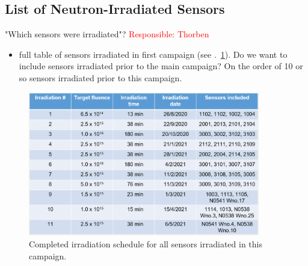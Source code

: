 \subsection{List of Neutron-Irradiated Sensors}
\label{subsec:sensors_irradiation}
"Which sensors were irradiated"? \textcolor{red}{Responsible: Thorben}
\begin{itemize}
  \item full table of sensors irradiated in first campaign (see .~\ref{fig:Irradiation_Schedule}). Do we want to include sensors irradiated prior to the main campaign? On the order of 10 or so sensors irradiated prior to this campaign.
\end{itemize}

\begin{figure}[!hbt]
  \begin{center}
    \includegraphics[width=0.90\textwidth]{figures/Completed_Irradiation_Schedule_at_RINSC}
    \caption{Completed irradiation schedule for all sensors irradiated in this campaign.}
    \label{fig:Irradiation_Schedule}
  \end{center}
\end{figure}


